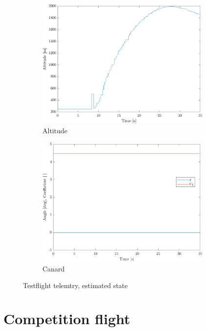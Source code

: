 \begin{figure}[ht]
\begin{subfigure}{0.45\textwidth}
        \includegraphics[width=0.95\textwidth]{images-results/testflight_alt.png}
        \caption{Altitude}
        \label{fig:testflight-alt}
    \end{subfigure}
    \begin{subfigure}{0.45\textwidth}
        \includegraphics[width=0.95\textwidth]{images-results/testflight_canard.png}
        \caption{Canard}
        \label{fig:testflight-canard}
    \end{subfigure}
    \caption{Testflight telemtry, estimated state}
    \label{fig:testflight}
\end{figure}

\clearpage
\section{Competition flight}
